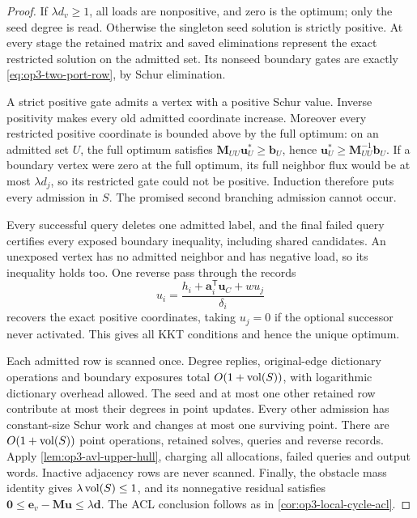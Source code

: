\begin{proof}
If $\lambda d_v\geq1$, all loads are nonpositive, and zero is the optimum;
only the seed degree is read. Otherwise the singleton seed solution is
strictly positive. At every stage the retained matrix and saved
eliminations represent the exact restricted solution on the admitted set.
Its nonseed boundary gates are exactly
\cref{eq:op3-two-port-row}, by Schur elimination.

A strict positive gate admits a vertex with a positive Schur value. Inverse
positivity makes every old admitted coordinate increase. Moreover every
restricted positive coordinate is bounded above by the full optimum:
on an admitted set $U$, the full optimum satisfies
$\bm M_{UU}\bm u^*_U\geq\bm b_U$, hence
$\bm u^*_U\geq\bm M_{UU}^{-1}\bm b_U$.
If a boundary vertex were zero at the full optimum, its full neighbor flux
would be at most $\lambda d_j$, so its restricted gate could not be
positive. Induction therefore puts every admission in $S$. The promised
second branching admission cannot occur.

Every successful query deletes one admitted label, and the final failed
query certifies every exposed boundary inequality, including shared
candidates. An unexposed vertex has no admitted neighbor and has negative
load, so its inequality holds too. One reverse pass through the records
\[
 u_i=\frac{h_i+\bm a_i^{\mathsf T}\bm u_C+w u_j}{\delta_i}
\]
recovers the exact positive coordinates, taking $u_j=0$ if the optional
successor never activated. This gives all KKT conditions and hence the
unique optimum.

Each admitted row is scanned once. Degree replies, original-edge dictionary
operations and boundary exposures total $O(1+\operatorname{vol}(S))$, with logarithmic
dictionary overhead allowed. The seed and at most one other retained row
contribute at most their degrees in point updates. Every other admission
has constant-size Schur work and changes at most one surviving point.
There are $O(1+\operatorname{vol}(S))$ point operations, retained solves, queries and
reverse records. Apply \cref{lem:op3-avl-upper-hull}, charging all
allocations, failed queries and output words. Inactive adjacency rows are
never scanned. Finally, the obstacle mass identity gives
$\lambda\operatorname{vol}(S)\leq1$, and its nonnegative residual satisfies
$\bm0\leq\bm e_v-\bm M\bm u\leq\lambda\bm d$.
The ACL conclusion follows as in \cref{cor:op3-local-cycle-acl}.
\end{proof}

